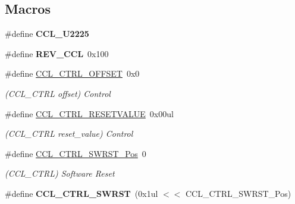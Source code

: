 \subsection*{Macros}
\begin{DoxyCompactItemize}
\item 
\hypertarget{group___s_a_m_l21___c_c_l_gabd6657bb413cbb9a53a44d024ae8e79f}{}\#define {\bfseries C\+C\+L\+\_\+\+U2225}\label{group___s_a_m_l21___c_c_l_gabd6657bb413cbb9a53a44d024ae8e79f}

\item 
\hypertarget{group___s_a_m_l21___c_c_l_gae6ff40ae2ffcdeb55569e4866b97f42c}{}\#define {\bfseries R\+E\+V\+\_\+\+C\+C\+L}~0x100\label{group___s_a_m_l21___c_c_l_gae6ff40ae2ffcdeb55569e4866b97f42c}

\item 
\hypertarget{group___s_a_m_l21___c_c_l_gaa3f64e2c1b09e63007b082f67e196ada}{}\#define \hyperlink{group___s_a_m_l21___c_c_l_gaa3f64e2c1b09e63007b082f67e196ada}{C\+C\+L\+\_\+\+C\+T\+R\+L\+\_\+\+O\+F\+F\+S\+E\+T}~0x0\label{group___s_a_m_l21___c_c_l_gaa3f64e2c1b09e63007b082f67e196ada}

\begin{DoxyCompactList}\small\item\em (C\+C\+L\+\_\+\+C\+T\+R\+L offset) Control \end{DoxyCompactList}\item 
\hypertarget{group___s_a_m_l21___c_c_l_ga5393c157a133f3e2d5c527f69eb3185d}{}\#define \hyperlink{group___s_a_m_l21___c_c_l_ga5393c157a133f3e2d5c527f69eb3185d}{C\+C\+L\+\_\+\+C\+T\+R\+L\+\_\+\+R\+E\+S\+E\+T\+V\+A\+L\+U\+E}~0x00ul\label{group___s_a_m_l21___c_c_l_ga5393c157a133f3e2d5c527f69eb3185d}

\begin{DoxyCompactList}\small\item\em (C\+C\+L\+\_\+\+C\+T\+R\+L reset\+\_\+value) Control \end{DoxyCompactList}\item 
\hypertarget{group___s_a_m_l21___c_c_l_gad7e603a55fe052e0c0a8cc5089e3d268}{}\#define \hyperlink{group___s_a_m_l21___c_c_l_gad7e603a55fe052e0c0a8cc5089e3d268}{C\+C\+L\+\_\+\+C\+T\+R\+L\+\_\+\+S\+W\+R\+S\+T\+\_\+\+Pos}~0\label{group___s_a_m_l21___c_c_l_gad7e603a55fe052e0c0a8cc5089e3d268}

\begin{DoxyCompactList}\small\item\em (C\+C\+L\+\_\+\+C\+T\+R\+L) Software Reset \end{DoxyCompactList}\item 
\hypertarget{group___s_a_m_l21___c_c_l_gac1d6563b01734b75550292ddfb130837}{}\#define {\bfseries C\+C\+L\+\_\+\+C\+T\+R\+L\+\_\+\+S\+W\+R\+S\+T}~(0x1ul $<$$<$ C\+C\+L\+\_\+\+C\+T\+R\+L\+\_\+\+S\+W\+R\+S\+T\+\_\+\+Pos)\label{group___s_a_m_l21___c_c_l_gac1d6563b01734b75550292ddfb130837}


\end{DoxyCompactItemize}

